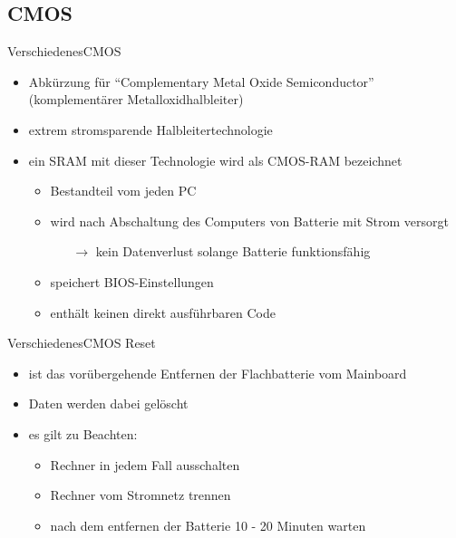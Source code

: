 \documentclass[9pt]{beamer}
\begin{document}
    \subsection{CMOS}
    \begin{frame}{Verschiedenes}{CMOS}
        \begin{itemize}
            \item Abkürzung für \enquote{Complementary Metal Oxide Semiconductor} (komplementärer Metalloxidhalbleiter)
            \item extrem stromsparende Halbleitertechnologie
            \item ein SRAM mit dieser Technologie wird als CMOS-RAM bezeichnet
            \begin{itemize}
                \item Bestandteil vom jeden PC
                \item wird nach Abschaltung des Computers von Batterie mit Strom versorgt
                \begin{itemize}
                    \item[$\rightarrow$] kein Datenverlust solange Batterie funktionsfähig
                \end{itemize}
                \item speichert BIOS-Einstellungen
                \item enthält keinen direkt ausführbaren Code
            \end{itemize}
        \end{itemize}
    \end{frame}
    

    \begin{frame}{Verschiedenes}{CMOS Reset}
        \begin{itemize}
        	\item ist das vorübergehende Entfernen der Flachbatterie vom Mainboard
        	\item Daten werden dabei gelöscht
        	\item es gilt zu Beachten:
        	\begin{itemize}
        		\item Rechner in jedem Fall ausschalten
        		\item Rechner vom Stromnetz trennen
        		\item nach dem entfernen der Batterie 10 - 20 Minuten warten
        	\end{itemize}
        \end{itemize}
    \end{frame}
\end{document}

